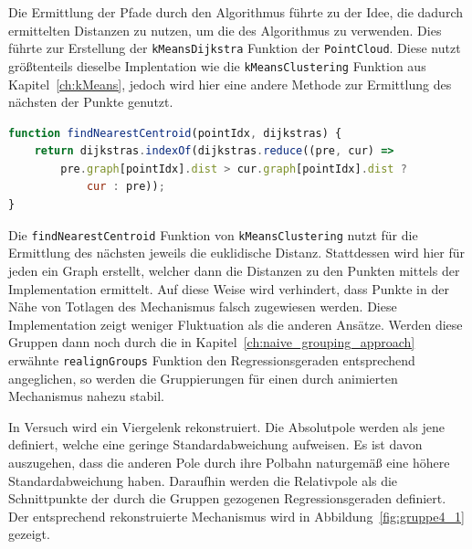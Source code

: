 Die Ermittlung der Pfade durch den  Algorithmus führte zu der Idee, die dadurch ermittelten Distanzen zu nutzen, um die  des  Algorithmus zu verwenden.
Dies führte zur Erstellung der \lstinline{kMeansDijkstra} Funktion der \lstinline{PointCloud}.
Diese nutzt grö{\ss}tenteils dieselbe Implentation wie die \lstinline{kMeansClustering} Funktion aus Kapitel~\ref{ch:kMeans}, jedoch wird hier eine andere Methode zur Ermittlung des nächsten  der Punkte genutzt.

\begin{lstlisting}[language=JavaScript, caption={Bestimmung des nächsten \name{Centroids} in der \lstinline{kMeansDijkstra} Funktion.}, label={lst:findNearestCentroidDijkstra}]
function findNearestCentroid(pointIdx, dijkstras) {
    return dijkstras.indexOf(dijkstras.reduce((pre, cur) =>
        pre.graph[pointIdx].dist > cur.graph[pointIdx].dist ?
            cur : pre));
}
\end{lstlisting}

Die \lstinline{findNearestCentroid} Funktion von \lstinline{kMeansClustering} nutzt für die Ermittlung des nächsten  jeweils die euklidische Distanz.
Stattdessen wird hier für jeden  ein Graph erstellt, welcher dann die Distanzen zu den Punkten mittels der  Implementation ermittelt.
Auf diese Weise wird verhindert, dass Punkte in der Nähe von Totlagen des Mechanismus falsch zugewiesen werden.
Diese Implementation zeigt weniger Fluktuation als die anderen Ansätze.
Werden diese Gruppen dann noch durch die in Kapitel~\ref{ch:naive_grouping_approach} erwähnte \lstinline{realignGroups} Funktion den Regressionsgeraden entsprechend angeglichen, so werden die Gruppierungen für einen durch  animierten Mechanismus nahezu stabil.

In Versuch  wird ein Viergelenk rekonstruiert.
Die Absolutpole werden als jene definiert, welche eine geringe Standardabweichung aufweisen.
Es ist davon auszugehen, dass die anderen Pole durch ihre Polbahn naturgemä{\ss} eine höhere Standardabweichung haben.
Daraufhin werden die Relativpole als die Schnittpunkte der durch die Gruppen gezogenen Regressionsgeraden definiert.
Der entsprechend rekonstruierte Mechanismus wird in Abbildung~\ref{fig:gruppe4_1} gezeigt.

